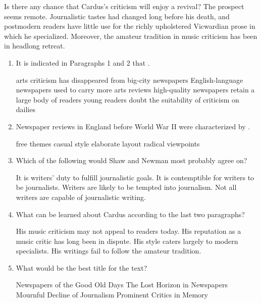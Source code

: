 Is there any chance that Cardus's criticism will enjoy a revival? The
prospect seems remote. Journalistic tastes had changed long before his
death, and postmodern readers have little use for the richly upholstered
Vicwardian prose in which he specialized. Moreover, the amateur
tradition in music criticism has been in headlong retreat.


\begin{enumerate}[resume]
	\item
It is indicated in Paragraphs 1 and 2 that \lineread.


\fourchoices
{arts criticism has disappeared from big-city newspapers}
{English-language newspapers used to carry more arts reviews}
{high-quality newspapers retain a large body of readers}
{young readers doubt the suitability of criticism on dailies}



\item
 Newspaper reviews in England before World War II were
characterized by \lineread.


\fourchoices
{free themes}
{casual style}
{elaborate layout}
{radical viewpoints}



\item
Which of the following would Shaw and Newman most probably
agree on?


\fourchoices
{It is writers' duty to fulfill journalistic goals.}
{It is contemptible for writers to be journalists.}
{Writers are likely to be tempted into journalism.}
{Not all writers are capable of journalistic writing.}



\item
 What can be learned about Cardus according to the last two
paragraphs?


\fourchoices
{His music criticism may not appeal to readers today.}
{His reputation as a music critic has long been in dispute.}
{His style caters largely to modern specialists.}
{His writings fail to follow the amateur tradition.}



\item
What would be the best title for the text?


\fourchoices
{Newspapers of the Good Old Days}
{The Lost Horizon in Newspapers}
{Mournful Decline of Journalism}
{Prominent Critics in Memory}

\end{enumerate}


